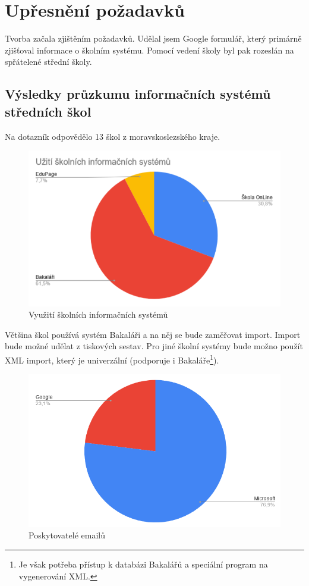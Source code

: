 \section{Upřesnění požadavků}
Tvorba začala zjištěním požadavků. Udělal jsem Google formulář, který primárně zjišťoval informace o školním systému. Pomocí vedení školy byl pak rozeslán na spřátelené střední školy. 
\subsection{Výsledky průzkumu informačních systémů středních škol}
Na dotazník odpovědělo 13 škol z moravskoslezského kraje.

\begin{figure}[h]
    \centering
    \includegraphics[width=0.5\linewidth]{Figures/vyuziti_skolnich_systemu.PNG}
    \caption{Využití školních informačních systémů}
    \label{fig:vyuziti-skolnich-systemu}
\end{figure}

Většina škol používá systém Bakaláři a na něj se bude zaměřovat import. Import bude možné udělat z tiskových sestav. Pro jiné školní systémy bude možno použít XML import, který je univerzální (podporuje i Bakaláře\footnote{Je však potřeba přístup k databázi Bakalářů a speciální program na vygenerování XML.}).


\newpage

\begin{figure}[t]
    \centering
    \includegraphics[width=0.5\linewidth]{Figures/poskytovatele_emailu.PNG}
    \caption{Poskytovatelé emailů}
    \label{fig:poskytovatele-emailu}
\end{figure}

